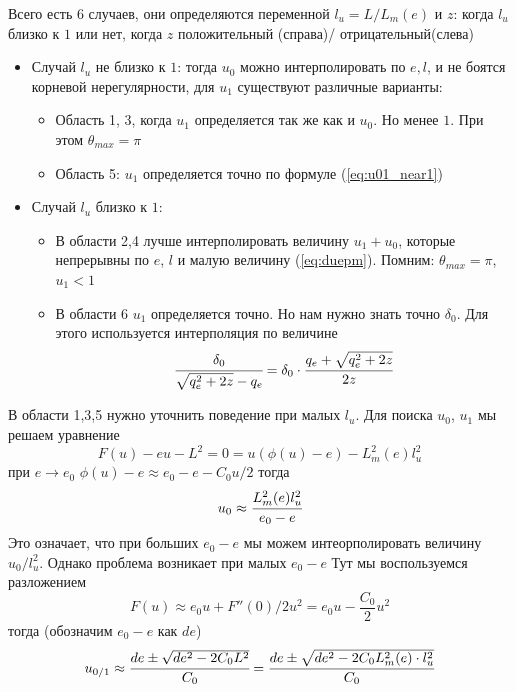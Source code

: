 \documentclass[a4paper, 14pt]{article}
\begin{document}
	Всего есть 6 случаев, они определяются переменной $l_u = L/L_m(e)$ и $z$: когда $l_u$ близко к $1$ или нет, когда $z$ положительный (справа)/ отрицательный(слева)
	\begin{itemize}
		\item Случай $l_u$ не близко к $1$: тогда $u_0$ можно интерполировать по $e,l$, и не боятся корневой нерегулярности, для $u_1$ существуют различные варианты:
		\begin{itemize}
			\item Область 1, 3, когда $u_1$ определяется так же как и $u_0$. Но менее $1$. 
			При этом $\theta_{max} = \pi$
			\item Область 5: $u_1$ определяется точно по формуле (\ref{eq:u01_near1})
		\end{itemize}
		\item Случай $l_u$ близко к $1$:
		\begin{itemize}
			\item В области 2,4 лучше интерполировать величину $u_1 + u_0$, которые непрерывны по $e$, $l$ и малую величину (\ref{eq:duepm}). Помним: $\theta_{max} = \pi$, $u_1<1$ 
			\item В области 6 $u_1$ определяется точно. Но нам нужно знать точно $\delta_0$. Для этого используется интерполяция по величине 
			\begin{equation*}
				\cfrac{\delta_0}{\sqrt{q_e^2+2z} - q_e} = 
				\delta_0\cdot\cfrac{q_e+\sqrt{q_e^2+2z}}{2z}
			\end{equation*}
		\end{itemize}
	\end{itemize}
	
	В области 1,3,5 нужно уточнить поведение при малых $l_u$. Для поиска $u_0$, $u_1$ мы решаем уравнение 
	\begin{equation*}
		F(u) - eu- L^2= 0 = u(\phi(u)-e) - L_m^2(e)l_u^2
	\end{equation*}
	при $e \rightarrow e_0$ $\phi(u)-e \approx e_0-e - C_0 u /2$
	тогда 
	\begin{equation*}
		u_0 \approx \cfrac{L_m^2(e)l_u^2}{e_0-e}
	\end{equation*}
	Это означает, что при больших $e_0-e$ мы можем интеорполировать величину $u_0/l_u^2$.
	Однако проблема возникает при малых $e_0-e$
	Тут мы воспользуемся разложением
	\begin{equation}
		F(u) \approx e_0 u + F''(0)/2 u^2 = 
		e_0 u - \frac{C_0}{2} u^2
		\label{eq:F_near_0}
	\end{equation}
	тогда (обозначим $e_0-e$ как $de$)
	\begin{equation}
	u_{0/1} \approx \cfrac{de \pm \sqrt{de^2-2C_0 L^2} }{C_0} =
	\cfrac{de \pm \sqrt{de^2-2C_0 L_m^2(e)\cdot l_u^2} }{C_0}
	\end{equation}
	
\end{document}
